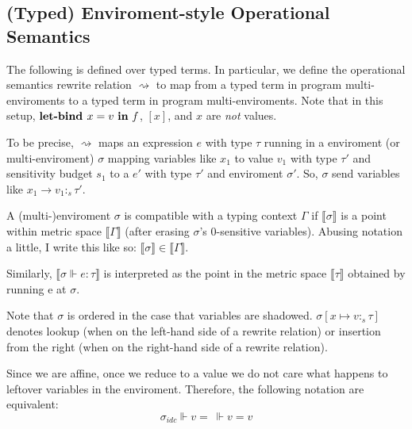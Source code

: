 \subsection{(Typed) Enviroment-style Operational Semantics}
The following is defined over typed terms. In particular, we define the
operational semantics rewrite relation $\rightsquigarrow$ to map from a typed
term in program multi-enviroments to a typed term in program multi-enviroments. Note
that in this setup, $\textbf{let-bind } x = v \ \textbf{in} \ f$, $[x]$, and $x$ are \textit{not}
values.

To be precise, $\rightsquigarrow$ maps an expression $e$ with type $\tau$
running in a enviroment (or multi-enviroment) $\sigma$ mapping variables like
$x_1$ to value $v_1$ with type $\tau'$ and sensitivity budget $s_1$ to a $e'$
with type $\tau'$ and enviroment $\sigma'$. So, $\sigma$ send variables like
$x_1 \to v_1 :_s \tau'$.

A (multi-)enviroment $\sigma$ is compatible with a typing context $\Gamma$ if
$\llbracket \sigma \rrbracket$ is a point within metric space $\llbracket \Gamma
\rrbracket$ (after erasing $\sigma$'s $0$-sensitive variables). Abusing notation
a little, I write this like so: $\llbracket \sigma \rrbracket \in \llbracket
\Gamma \rrbracket$.


Similarly, $\llbracket \sigma \Vdash e : \tau \rrbracket$ is
interpreted as the point in the metric space $\llbracket \tau \rrbracket$
obtained by running e at $\sigma$.

Note that $\sigma$ is ordered in the case that variables are shadowed. $\sigma[x
\mapsto v :_s \tau]$ denotes lookup (when on the left-hand side of a rewrite
relation) or insertion from the right (when on the right-hand side of a rewrite
relation).

Since we are affine, once we reduce to a value we do not care what happens to
leftover variables in the enviroment. Therefore, the following notation are
equivalent:
$$
\sigma_{idc} \Vdash v = \ \Vdash v = v
$$

